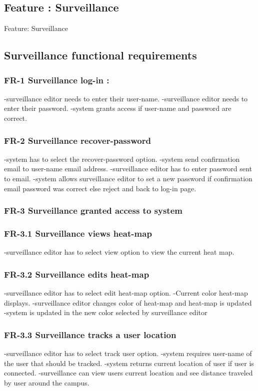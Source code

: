 \begin{Requirements}
\section{Feature : Surveillance}
Feature:  Surveillance 
\subsection{Surveillance functional requirements}
 \subsubsection{FR-1 Surveillance log-in :}
 		-surveillance editor needs to enter their user-name.
 		-surveillance editor needs to enter their password.
 		-system grants access if user-name and password are correct.
 \subsubsection{FR-2 Surveillance recover-password}
 		-system has to select the recover-password option.
 		-system send confirmation email to user-name email address.
		-surveillance editor has to enter password sent to email.
	  	-system allows surveillance editor to set a new password if confirmation email password was correct else reject and back to 		     log-in page.
	  	
\subsubsection{FR-3 Surveillance granted access to system}
\subsubsection{FR-3.1 Surveillance views heat-map}
		-surveillance editor has to select view option to view the current heat map.
\subsubsection{FR-3.2 Surveillance edits heat-map}
		-surveillance editor has to select edit heat-map option.
		-Current color heat-map displays.
		-surveillance editor changes color of heat-map and heat-map is updated
		-system is updated in the new color selected by surveillance editor
\subsubsection{FR-3.3 Surveillance tracks a user location}
		-surveillance editor has to select track user option.
		-system requires user-name of the user that should be tracked.
		-system returns current location of user if user is connected.
		-surveillance can view users current location and see distance traveled by user around the campus.

\end{Requirements}
